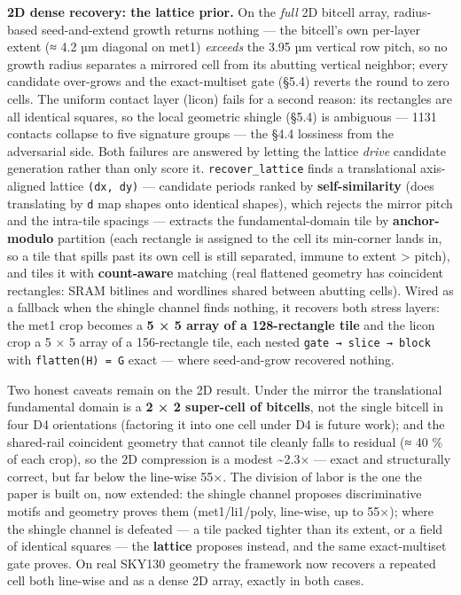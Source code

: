 \documentclass[
  11pt,
]{article}
\begin{document}
\textbf{2D dense recovery: the lattice prior.} On the \emph{full} 2D
bitcell array, radius-based seed-and-extend growth returns nothing ---
the bitcell's own per-layer extent (≈ 4.2 µm diagonal on met1)
\emph{exceeds} the 3.95 µm vertical row pitch, so no growth radius
separates a mirrored cell from its abutting vertical neighbor; every
candidate over-grows and the exact-multiset gate (§5.4) reverts the
round to zero cells. The uniform contact layer (licon) fails for a
second reason: its rectangles are all identical squares, so the local
geometric shingle (§5.4) is ambiguous --- 1131 contacts collapse to five
signature groups --- the §4.4 lossiness from the adversarial side. Both
failures are answered by letting the lattice \emph{drive} candidate
generation rather than only score it. \texttt{recover\_lattice} finds a
translational axis-aligned lattice \texttt{(dx,\ dy)} --- candidate
periods ranked by \textbf{self-similarity} (does translating by
\texttt{d} map shapes onto identical shapes), which rejects the mirror
pitch and the intra-tile spacings --- extracts the fundamental-domain
tile by \textbf{anchor-modulo} partition (each rectangle is assigned to
the cell its min-corner lands in, so a tile that spills past its own
cell is still separated, immune to extent \textgreater{} pitch), and
tiles it with \textbf{count-aware} matching (real flattened geometry has
coincident rectangles: SRAM bitlines and wordlines shared between
abutting cells). Wired as a fallback when the shingle channel finds
nothing, it recovers both stress layers: the met1 crop becomes a
\textbf{5 × 5 array of a 128-rectangle tile} and the licon crop a 5 × 5
array of a 156-rectangle tile, each nested
\texttt{gate\ →\ slice\ →\ block} with \texttt{flatten(H)\ =\ G} exact
--- where seed-and-grow recovered nothing.

Two honest caveats remain on the 2D result. Under the mirror the
translational fundamental domain is a \textbf{2 × 2 super-cell of
bitcells}, not the single bitcell in four D4 orientations (factoring it
into one cell under D4 is future work); and the shared-rail coincident
geometry that cannot tile cleanly falls to residual (≈ 40 \% of each
crop), so the 2D compression is a modest \textasciitilde2.3× --- exact
and structurally correct, but far below the line-wise 55×. The division
of labor is the one the paper is built on, now extended: the shingle
channel proposes discriminative motifs and geometry proves them
(met1/li1/poly, line-wise, up to 55×); where the shingle channel is
defeated --- a tile packed tighter than its extent, or a field of
identical squares --- the \textbf{lattice} proposes instead, and the
same exact-multiset gate proves. On real SKY130 geometry the framework
now recovers a repeated cell both line-wise and as a dense 2D array,
exactly in both cases.
\end{document}

